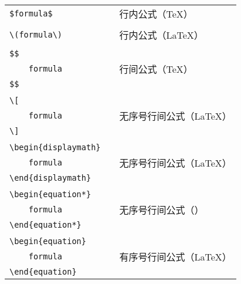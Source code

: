 \documentclass{ctexbook}
\begin{document}
\begin{table}[h!]
	\centering
	\begin{tabular}{l p{6em} l}
		\verb|$|{\color{gray}\verb|formula|}\verb|$|   && 行内公式（\TeX） \\
		                                               && \\
		\verb|\(|{\color{gray}\verb|formula|}\verb|\)| && 行内公式（\LaTeX） \\
		                                               && \\
		\verb|$$|                                      && \\
		\verb|    |{\color{gray}\verb|formula|}        && 行间公式（\TeX） \\
		\verb|$$|                                      && \\
		                                               && \\
		\verb|\[|                                      && \\
		\verb|    |{\color{gray}\verb|formula|}        && 无序号行间公式（\LaTeX） \\
		\verb|\]|                                      && \\
		                                               && \\
		\verb|\begin{displaymath}|                     && \\
		\verb|    |{\color{gray}\verb|formula|}        && 无序号行间公式（\LaTeX） \\
		\verb|\end{displaymath}|                       && \\
		                                               && \\
		\verb|\begin{equation*}|                       && \\
		\verb|    |{\color{gray}\verb|formula|}        && 无序号行间公式（\AmS） \\
		\verb|\end{equation*}|                         && \\
		                                               && \\
		\verb|\begin{equation}|                        && \\
		\verb|    |{\color{gray}\verb|formula|}        && 有序号行间公式（\LaTeX） \\
		\verb|\end{equation}|                          && \\
	\end{tabular}
\end{table}
\end{document}
